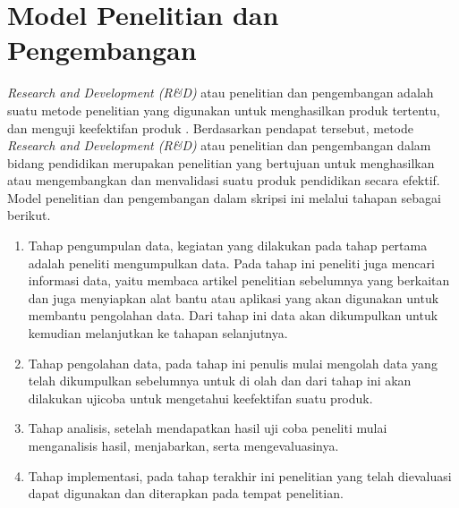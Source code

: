 \section{Model Penelitian dan Pengembangan}

\textit{Research and Development (R\&D)} atau penelitian dan pengembangan adalah suatu metode penelitian yang digunakan untuk menghasilkan produk tertentu, dan menguji keefektifan produk \cite{sugiyono2013metode}. 
Berdasarkan pendapat tersebut, metode \textit{Research and Development (R\&D)} atau penelitian dan pengembangan dalam bidang pendidikan merupakan penelitian yang bertujuan untuk menghasilkan atau mengembangkan dan menvalidasi suatu produk pendidikan secara efektif.
Model penelitian dan pengembangan dalam skripsi ini melalui tahapan sebagai berikut.

\begin{enumerate}
	\item Tahap pengumpulan data, kegiatan yang dilakukan pada tahap pertama adalah peneliti mengumpulkan data. Pada tahap ini peneliti juga mencari informasi data, yaitu membaca artikel penelitian sebelumnya yang berkaitan dan juga menyiapkan alat bantu atau aplikasi yang akan digunakan untuk membantu pengolahan data. Dari tahap ini data akan dikumpulkan untuk kemudian melanjutkan ke tahapan selanjutnya.
	\item Tahap pengolahan data, pada tahap ini penulis mulai mengolah data yang telah dikumpulkan sebelumnya untuk di olah dan dari tahap ini akan dilakukan ujicoba untuk mengetahui keefektifan suatu produk.
	\item Tahap analisis, setelah mendapatkan hasil uji coba peneliti mulai menganalisis hasil, menjabarkan, serta mengevaluasinya.
	\item Tahap implementasi, pada tahap terakhir ini penelitian yang telah dievaluasi dapat digunakan dan diterapkan pada tempat penelitian.
\end{enumerate}